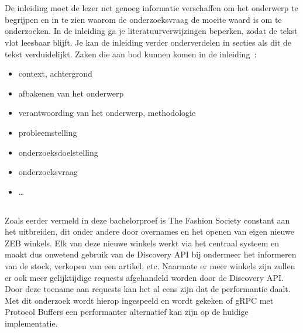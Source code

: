 
\chapter{}
\label{ch:inleiding}

De inleiding moet de lezer net genoeg informatie verschaffen om het onderwerp te begrijpen en in te zien waarom de onderzoeksvraag de moeite waard is om te onderzoeken. In de inleiding ga je literatuurverwijzingen beperken, zodat de tekst vlot leesbaar blijft. Je kan de inleiding verder onderverdelen in secties als dit de tekst verduidelijkt. Zaken die aan bod kunnen komen in de inleiding~\autocite{Pollefliet2011}:

\begin{itemize}
  \item context, achtergrond
  \item afbakenen van het onderwerp
  \item verantwoording van het onderwerp, methodologie
  \item probleemstelling
  \item onderzoeksdoelstelling
  \item onderzoeksvraag
  \item \ldots
\end{itemize}

\section{}
\label{sec:probleemstelling}

Zoals eerder vermeld in deze bachelorproef is The Fashion Society constant aan het uitbreiden, dit onder andere door overnames en het openen van eigen nieuwe ZEB winkels. Elk van deze nieuwe winkels werkt via het centraal systeem en maakt dus onwetend gebruik van de Discovery API bij ondermeer het informeren van de stock, verkopen van een artikel, etc. Naarmate er meer winkels zijn zullen er ook meer gelijktijdige requests afgehandeld worden door de Discovery API. Door deze toename aan requests kan het al eens zijn dat de performantie daalt. Met dit onderzoek wordt hierop ingespeeld en wordt gekeken of gRPC met Protocol Buffers een performanter alternatief kan zijn op de huidige implementatie.

